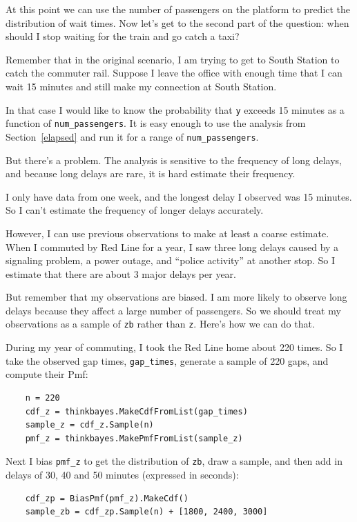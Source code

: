 \documentclass[12pt]{book}
\begin{document}
At this point we can use the number of passengers on the platform
to predict the distribution of wait times.  Now
let's get to the second part of the question: when should I stop
waiting for the train and go catch a taxi?

Remember that in the original scenario, I am trying to get to
South Station to catch the commuter rail.  Suppose I leave
the office with enough time that I can wait 15 minutes
and still make my connection at South Station.

In that case I would like to know the probability that {\tt y} exceeds
15 minutes as a function of \verb"num_passengers".  It is easy enough
to use the
analysis from Section~\ref{elapsed} and run it for a range of
\verb"num_passengers".

But there's a problem.
The analysis is sensitive to the frequency of long delays, and
because long delays are rare, it is hard estimate
their frequency.

I only have data from one week,
and the longest delay I observed was 15 minutes.  So I can't
estimate the frequency of longer delays accurately.

However, I can use previous observations to make at least a coarse
estimate.  When I commuted by Red Line for a year, I saw three long
delays caused by a signaling problem, a power outage, and ``police
activity'' at another stop.  So I estimate that there are about
3 major delays per year.

But remember that my observations are biased.  I am more likely
to observe long delays because they affect a large number
of passengers.  So we should treat my observations as a sample
of {\tt zb} rather than {\tt z}.  Here's how we can do that.

During my year of commuting, I took the Red Line home about 220
times.  So I take the observed gap times, \verb"gap_times",
generate a sample of 220 gaps, and compute their Pmf:

\begin{verbatim}
    n = 220
    cdf_z = thinkbayes.MakeCdfFromList(gap_times)
    sample_z = cdf_z.Sample(n)
    pmf_z = thinkbayes.MakePmfFromList(sample_z)
\end{verbatim}

Next I bias \verb"pmf_z" to get the distribution of
{\tt zb}, draw a sample, and then add in delays of
30, 40 and 50 minutes (expressed in seconds):

\begin{verbatim}
    cdf_zp = BiasPmf(pmf_z).MakeCdf()
    sample_zb = cdf_zp.Sample(n) + [1800, 2400, 3000]
\end{verbatim}
\end{document}
